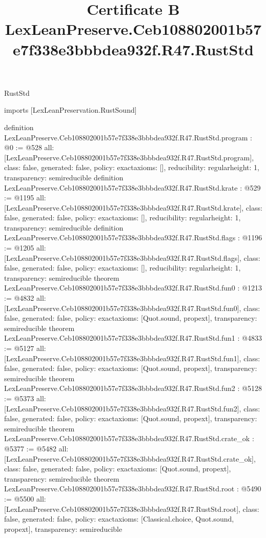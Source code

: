 \begin{lexlean}{RustStd}
\title{Certificate B LexLeanPreserve.Ceb108802001b57e7f338e3bbbdea932f.R47.RustStd}
\begin{coremodule}
imports [LexLeanPreservation.RustSound]

definition LexLeanPreserve.Ceb108802001b57e7f338e3bbbdea932f.R47.RustStd.program : @0 := @528 {
  all: [LexLeanPreserve.Ceb108802001b57e7f338e3bbbdea932f.R47.RustStd.program],
  class: false,
  generated: false,
  policy: exact{axioms: []},
  reducibility: regular{height: 1},
  transparency: semireducible
}
definition LexLeanPreserve.Ceb108802001b57e7f338e3bbbdea932f.R47.RustStd.krate : @529 := @1195 {
  all: [LexLeanPreserve.Ceb108802001b57e7f338e3bbbdea932f.R47.RustStd.krate],
  class: false,
  generated: false,
  policy: exact{axioms: []},
  reducibility: regular{height: 1},
  transparency: semireducible
}
definition LexLeanPreserve.Ceb108802001b57e7f338e3bbbdea932f.R47.RustStd.flags : @1196 := @1205 {
  all: [LexLeanPreserve.Ceb108802001b57e7f338e3bbbdea932f.R47.RustStd.flags],
  class: false,
  generated: false,
  policy: exact{axioms: []},
  reducibility: regular{height: 1},
  transparency: semireducible
}
theorem LexLeanPreserve.Ceb108802001b57e7f338e3bbbdea932f.R47.RustStd.fun0 : @1213 := @4832 {
  all: [LexLeanPreserve.Ceb108802001b57e7f338e3bbbdea932f.R47.RustStd.fun0],
  class: false,
  generated: false,
  policy: exact{axioms: [Quot.sound, propext]},
  transparency: semireducible
}
theorem LexLeanPreserve.Ceb108802001b57e7f338e3bbbdea932f.R47.RustStd.fun1 : @4833 := @5127 {
  all: [LexLeanPreserve.Ceb108802001b57e7f338e3bbbdea932f.R47.RustStd.fun1],
  class: false,
  generated: false,
  policy: exact{axioms: [Quot.sound, propext]},
  transparency: semireducible
}
theorem LexLeanPreserve.Ceb108802001b57e7f338e3bbbdea932f.R47.RustStd.fun2 : @5128 := @5373 {
  all: [LexLeanPreserve.Ceb108802001b57e7f338e3bbbdea932f.R47.RustStd.fun2],
  class: false,
  generated: false,
  policy: exact{axioms: [Quot.sound, propext]},
  transparency: semireducible
}
theorem LexLeanPreserve.Ceb108802001b57e7f338e3bbbdea932f.R47.RustStd.crate_ok : @5377 := @5482 {
  all: [LexLeanPreserve.Ceb108802001b57e7f338e3bbbdea932f.R47.RustStd.crate_ok],
  class: false,
  generated: false,
  policy: exact{axioms: [Quot.sound, propext]},
  transparency: semireducible
}
theorem LexLeanPreserve.Ceb108802001b57e7f338e3bbbdea932f.R47.RustStd.root : @5490 := @5500 {
  all: [LexLeanPreserve.Ceb108802001b57e7f338e3bbbdea932f.R47.RustStd.root],
  class: false,
  generated: false,
  policy: exact{axioms: [Classical.choice, Quot.sound, propext]},
  transparency: semireducible
}


\end{coremodule}
\end{lexlean}
